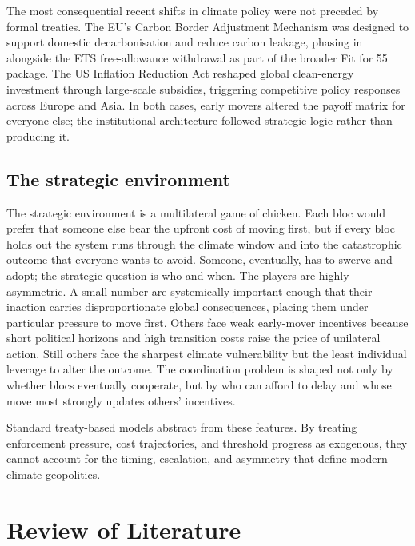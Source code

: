 \documentclass[10pt,a4paper]{article}
\begin{document}
The most consequential recent shifts in climate policy were not preceded by formal treaties. The EU's Carbon Border Adjustment Mechanism was designed to support domestic decarbonisation and reduce carbon leakage, phasing in alongside the ETS free-allowance withdrawal as part of the broader Fit for 55 package. The US Inflation Reduction Act reshaped global clean-energy investment through large-scale subsidies, triggering competitive policy responses across Europe and Asia. In both cases, early movers altered the payoff matrix for everyone else; the institutional architecture followed strategic logic rather than producing it.

\subsection*{The strategic environment}

The strategic environment is a multilateral game of chicken. Each bloc would prefer that someone else bear the upfront cost of moving first, but if every bloc holds out the system runs through the climate window and into the catastrophic outcome that everyone wants to avoid. Someone, eventually, has to swerve and adopt; the strategic question is who and when. The players are highly asymmetric. A small number are systemically important enough that their inaction carries disproportionate global consequences, placing them under particular pressure to move first. Others face weak early-mover incentives because short political horizons and high transition costs raise the price of unilateral action. Still others face the sharpest climate vulnerability but the least individual leverage to alter the outcome. The coordination problem is shaped not only by whether blocs eventually cooperate, but by who can afford to delay and whose move most strongly updates others' incentives.

Standard treaty-based models abstract from these features. By treating enforcement pressure, cost trajectories, and threshold progress as exogenous, they cannot account for the timing, escalation, and asymmetry that define modern climate geopolitics.


\clearpage
\needspace{12em}
\section{Review of Literature}
\end{document}
